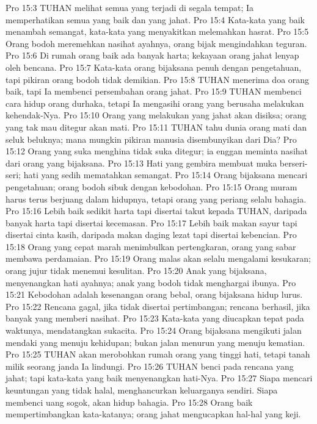 Pro 15:3  TUHAN melihat semua yang terjadi di segala tempat; Ia memperhatikan semua yang baik dan yang jahat.
Pro 15:4  Kata-kata yang baik menambah semangat, kata-kata yang menyakitkan melemahkan hasrat.
Pro 15:5  Orang bodoh meremehkan nasihat ayahnya, orang bijak mengindahkan teguran.
Pro 15:6  Di rumah orang baik ada banyak harta; kekayaan orang jahat lenyap oleh bencana.
Pro 15:7  Kata-kata orang bijaksana penuh dengan pengetahuan, tapi pikiran orang bodoh tidak demikian.
Pro 15:8  TUHAN menerima doa orang baik, tapi Ia membenci persembahan orang jahat.
Pro 15:9  TUHAN membenci cara hidup orang durhaka, tetapi Ia mengasihi orang yang berusaha melakukan kehendak-Nya.
Pro 15:10  Orang yang melakukan yang jahat akan disiksa; orang yang tak mau ditegur akan mati.
Pro 15:11  TUHAN tahu dunia orang mati dan seluk beluknya; mana mungkin pikiran manusia disembunyikan dari Dia?
Pro 15:12  Orang yang suka menghina tidak suka ditegur; ia enggan meminta nasihat dari orang yang bijaksana.
Pro 15:13  Hati yang gembira membuat muka berseri-seri; hati yang sedih mematahkan semangat.
Pro 15:14  Orang bijaksana mencari pengetahuan; orang bodoh sibuk dengan kebodohan.
Pro 15:15  Orang muram harus terus berjuang dalam hidupnya, tetapi orang yang periang selalu bahagia.
Pro 15:16  Lebih baik sedikit harta tapi disertai takut kepada TUHAN, daripada banyak harta tapi disertai kecemasan.
Pro 15:17  Lebih baik makan sayur tapi disertai cinta kasih, daripada makan daging lezat tapi disertai kebencian.
Pro 15:18  Orang yang cepat marah menimbulkan pertengkaran, orang yang sabar membawa perdamaian.
Pro 15:19  Orang malas akan selalu mengalami kesukaran; orang jujur tidak menemui kesulitan.
Pro 15:20  Anak yang bijaksana, menyenangkan hati ayahnya; anak yang bodoh tidak menghargai ibunya.
Pro 15:21  Kebodohan adalah kesenangan orang bebal, orang bijaksana hidup lurus.
Pro 15:22  Rencana gagal, jika tidak disertai pertimbangan; rencana berhasil, jika banyak yang memberi nasihat.
Pro 15:23  Kata-kata yang diucapkan tepat pada waktunya, mendatangkan sukacita.
Pro 15:24  Orang bijaksana mengikuti jalan mendaki yang menuju kehidupan; bukan jalan menurun yang menuju kematian.
Pro 15:25  TUHAN akan merobohkan rumah orang yang tinggi hati, tetapi tanah milik seorang janda Ia lindungi.
Pro 15:26  TUHAN benci pada rencana yang jahat; tapi kata-kata yang baik menyenangkan hati-Nya.
Pro 15:27  Siapa mencari keuntungan yang tidak halal, menghancurkan keluarganya sendiri. Siapa membenci uang sogok, akan hidup bahagia.
Pro 15:28  Orang baik mempertimbangkan kata-katanya; orang jahat mengucapkan hal-hal yang keji.
